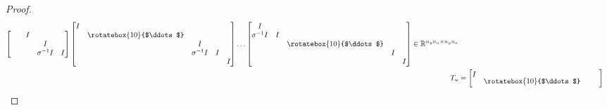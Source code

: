 \begin{proof}
\begin{subequations}
\begin{align}
\begin{bmatrix}
                                  & & I & & \\
                                  & & & I &  \\
                                  & & & \sigma^{-1} I & I \end{bmatrix}
                    \begin{bmatrix} I & & & & \\
                                  & \raisebox{0pt}{\rotatebox{10}{$\ddots$}} & & & \\
                                  & & I &   & \\
                                  & & \sigma^{-1} I& I & \\
                                  & & & & I \end{bmatrix}
                    \hdots
                    \begin{bmatrix} I & & & & \\
                                  \sigma^{-1} I& I & & & \\
                                  & & \raisebox{0pt}{\rotatebox{10}{$\ddots$}} &   & \\
                                  & & & I & \\
                                  & & & & I \end{bmatrix}
                    \in\Ree^{n_y n_a \times n_y n_a} \\
        T_{u} &=   \begin{bmatrix} I \vspace{-3pt} & & & & \\
                                  & \raisebox{0pt}{\rotatebox{10}{$\ddots$}} \hspace{-5pt} & & & \\

\end{bmatrix}
\end{align}
\end{subequations}
\end{proof}
